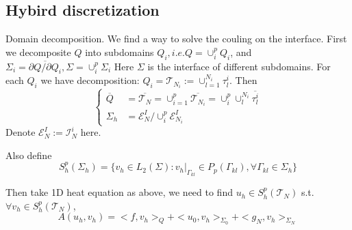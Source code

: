 \subsection{Hybird discretization}
Domain decomposition. We find a way to solve the couling on the interface. First we decomposite $Q$ into subdomains $Q_i, i.e.Q=\cup_i^pQ_i$, and $\Sigma_i=\overline{\partial Q/\partial Q_i},\Sigma=\cup_i^p \Sigma_i$
Here $\Sigma$ is the interface of different subdomains. For each $Q_i$ we have decomposition: $Q_i=\mathscr{T}_{N_i}:=\cup_{l=1}^{N_i}\tau_l^i$. 
Then $$\left\{
    \begin{aligned}
        \overline{Q}&=\overline{\mathscr{T}_N}=\cup_{i=1}^p\overline{\mathscr{T}_{N_i}}=\cup_i^p\cup_l^{N_i}\overline{\tau_l^i}\\
        \Sigma_h&=\mathscr{E}_N^I/ \cup_i^p\mathscr{E}_{N_i}^I
    \end{aligned}\right.$$
Denote $\mathscr{E}_N^I:=\mathcal{I}_N^i$ here. 

\begin{center}
\end{center}

Also define $$S_h^p(\Sigma_h)=\{v_h\in L_2(\Sigma):v_h|_{\Gamma_{kl}}\in P_p(\Gamma_{kl}),\forall \Gamma_{kl}\in \Sigma_h\}$$

Then take 1D heat equation as above, we need to find $u_h \in S_h^p(\mathscr{T}_N)$ s.t.$\forall v_h\in S_h^p(\mathscr{T}_N)$, $$A(u_h,v_h)=<f,v_h>_Q+<u_0,v_h>_{\Sigma_0}+<g_N,v_h>_{\Sigma_N}$$ 

